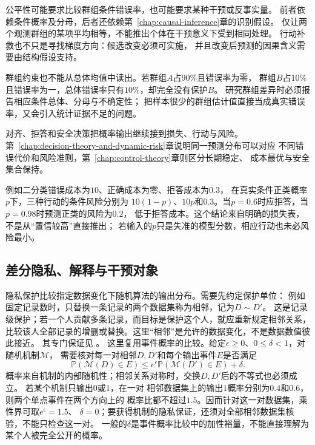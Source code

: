 公平性可能要求比较群组条件错误率，也可能要求某种干预或反事实量。
前者依赖条件概率及分母，后者还依赖第~\ref{chap:causal-inference}章的识别假设。
仅让两个观测群组的某项平均相等，不能推出个体在干预意义下受到相同处理。
行动补救也不只是寻找梯度方向：候选改变必须可实施，
并且改变后预测的因果含义需要由结构假设支持。

群组约束也不能从总体均值中读出。若群组$A$占$90\%$且错误率为零，
群组$B$占$10\%$且错误率为一，总体错误率只有$10\%$，却完全没有保护$B$。
研究群组差异时必须报告相应条件总体、分母与不确定性；
把样本很少的群组估计值直接当成真实错误率，又会引入统计证据不足的问题。

对齐、拒答和安全决策把概率输出继续接到损失、行动与风险。
第~\ref{chap:decision-theory-and-dynamic-risk}章说明同一预测分布可以对应
不同错误代价和风险准则，第~\ref{chap:control-theory}章则区分长期稳定、
成本最优与安全集合保持。

例如二分类错误成本为$10$、正确成本为零、拒答成本为$0.3$，
在真实条件正类概率$p$下，三种行动的条件风险分别为
$10(1-p)$、$10p$和$0.3$。当$p=0.6$时应拒答，当$p=0.98$时预测正类的风险为$0.2$，
低于拒答成本。这个结论来自明确的损失表，不是从“置信较高”直接推出；
若输入的$p$只是失准的模型分数，相应行动也未必风险最小。

\subsection{差分隐私、解释与干预对象}
\label{sec:future-data-changes-privacy-explanation}

隐私保护比较指定数据变化下随机算法的输出分布。需要先约定保护单位：
例如固定记录数时，只替换一条记录的两个数据集称为相邻，记为$D\sim D'$。
这是记录级保护；若一个人贡献多条记录，而目标是保护这个人，就应重新规定相邻关系，
比较该人全部记录的增删或替换。这里“相邻”是允许的数据变化，不是数据数值彼此接近。
其专门保证见
。
这里复用事件概率的比较。给定$\epsilon\geq0$、$0\leq\delta<1$，对随机机制$\mathcal M$，
需要核对每一对相邻$D,D'$和每个输出事件$E$是否满足
\[
  \mathbb P(\mathcal M(D)\in E)
  \leq e^\epsilon\mathbb P(\mathcal M(D')\in E)+\delta.
\]
概率来自机制的内部随机性；相邻关系对称时，交换$D,D'$后的不等式也必须成立。
若某个机制只输出$0$或$1$，在一对
相邻数据集上的输出$1$概率分别为$0.4$和$0.6$，则两个单点事件在两个方向上的
概率比都不超过$1.5$。因而针对这一对数据集，乘性界可取$e^\epsilon=1.5$、
$\delta=0$；要获得机制的隐私保证，还须对全部相邻数据集核验，不能只检查这一对。
一般的$\delta$是事件概率比较中的加性裕量，不能直接理解为某个人被完全公开的概率。

